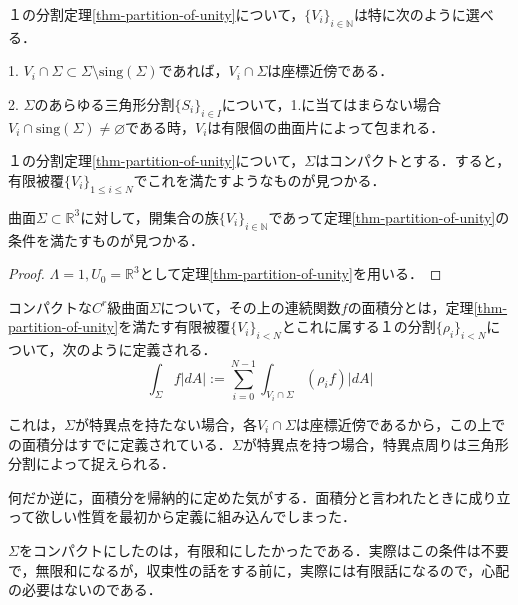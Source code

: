 \documentclass[uplatex, dvipdfmx]{jsreport}
\begin{document}
\begin{lemma}\label{lemma-requirements-for-partitions-of-unity}
    １の分割定理\ref{thm-partition-of-unity}について，$\{V_i\}_{i\in\mathbb{N}}$は特に次のように選べる．

    1. $V_i\cap\Sigma \subset \Sigma\setminus\mathrm{sing}(\Sigma)$であれば，$V_i\cap\Sigma$は座標近傍である．

    2. $\Sigma$のあらゆる三角形分割$\{S_i\}_{i\in I}$について，1.に当てはまらない場合$V_i\cap\mathrm{sing}(\Sigma)\ne\varnothing$である時，$V_i$は有限個の曲面片によって包まれる．
\end{lemma}
\begin{lemma}
    １の分割定理\ref{thm-partition-of-unity}について，$\Sigma$はコンパクトとする．すると，有限被覆$\{V_i\}_{1\le i\le N}$でこれを満たすようなものが見つかる．
\end{lemma}

\begin{corollary}\label{corollary-existence-of-partitions-of-unity}
    曲面$\Sigma\subset\mathbb{R}^3$に対して，開集合の族$\{V_i\}_{i\in\mathbb{N}}$であって定理\ref{thm-partition-of-unity}の条件を満たすものが見つかる．
\end{corollary}
\begin{proof}
    $\Lambda = 1, U_0=\mathbb{R}^3$として定理\ref{thm-partition-of-unity}を用いる．
\end{proof}
\begin{shadebox}
\begin{definition}
    コンパクトな$C^r$級曲面$\Sigma$について，その上の連続関数$f$の面積分とは，定理\ref{thm-partition-of-unity}を満たす有限被覆$\{V_i\}_{i<N}$とこれに属する１の分割$\{\rho_i\}_{i<N}$について，次のように定義される．
    \[ \int_\Sigma f|dA| := \sum^{N-1}_{i=0} \int_{V_i\cap\Sigma}(\rho_if)|dA| \]
\end{definition}
\end{shadebox}
\begin{remark}
    これは，$\Sigma$が特異点を持たない場合，各$V_i\cap\Sigma$は座標近傍であるから，この上での面積分はすでに定義されている．$\Sigma$が特異点を持つ場合，特異点周りは三角形分割によって捉えられる．

    何だか逆に，面積分を帰納的に定めた気がする．面積分と言われたときに成り立って欲しい性質を最初から定義に組み込んでしまった．

    $\Sigma$をコンパクトにしたのは，有限和にしたかったである．実際はこの条件は不要で，無限和になるが，収束性の話をする前に，実際には有限話になるので，心配の必要はないのである．
\end{remark}
\end{document}
